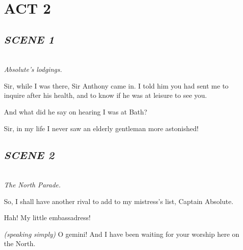 \documentclass[11pt,a4paper,oneside]{memoir}  %
\begin{document}
  
  \chapter*{ACT 2}
  
  \section*{\hfill\textit{SCENE 1}}  %
  \begin{description}[itemsep=1ex,leftmargin=1cm]
    \setlength{\parskip}{5pt}
    
    \item[] \hfill \\
    \textit{Absolute's lodgings.}
    
    \item[FAG] Sir, while I was there, Sir Anthony came in.  I told him you had sent me to inquire after his health, and to know if he was at leisure to see you.
    
    \item[ABSOLUTE] And what did he say on hearing I was at Bath?
    
    \item[FAG] Sir, in my life I never saw an elderly gentleman more astonished!
    
  \end{description}
  \vskip 1cm
  
  \section*{\hfill\textit{SCENE 2}}
  \begin{description}[itemsep=1ex,leftmargin=1cm]
    \setlength{\parskip}{5pt}
    
    \item[] \hfill \\
    \textit{The North Parade.}
    
    \item[LUCY] So, I shall have another rival to add to my mistress's list, Captain Absolute.
    
    \item[SIR LUCIUS] Hah! My little embassadress!
    
    \item[LUCY] \textit{(speaking simply)} O gemini!  And I have been waiting for your worship here on the North.
    
  \end{description}
  \vskip 1cm
  
  
\end{document}

